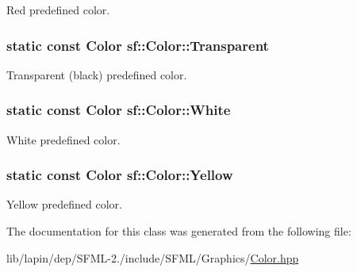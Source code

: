 Red predefined color. 

\hypertarget{classsf_1_1_color_a422c310394afa396d3a2798aad982145}{
\subsubsection[{Transparent}]{\setlength{\rightskip}{0pt plus 5cm}static {\bf const} {\bf Color} sf\-::\-Color\-::\-Transparent\hspace{0.3cm}{\ttfamily [static]}}}\label{classsf_1_1_color_a422c310394afa396d3a2798aad982145}


Transparent (black) predefined color. 

\hypertarget{classsf_1_1_color_abd9695b00da63b890ea40f74629237c0}{
\subsubsection[{White}]{\setlength{\rightskip}{0pt plus 5cm}static {\bf const} {\bf Color} sf\-::\-Color\-::\-White\hspace{0.3cm}{\ttfamily [static]}}}\label{classsf_1_1_color_abd9695b00da63b890ea40f74629237c0}


White predefined color. 

\hypertarget{classsf_1_1_color_ad2e5e0bad294384b8cf26a92d8d8d162}{
\subsubsection[{Yellow}]{\setlength{\rightskip}{0pt plus 5cm}static {\bf const} {\bf Color} sf\-::\-Color\-::\-Yellow\hspace{0.3cm}{\ttfamily [static]}}}\label{classsf_1_1_color_ad2e5e0bad294384b8cf26a92d8d8d162}


Yellow predefined color. 



The documentation for this class was generated from the following file\-:\begin{DoxyCompactItemize}
\item 
lib/lapin/dep/\-S\-F\-M\-L-\/2./include/\-S\-F\-M\-L/\-Graphics/\hyperlink{lib_2lapin_2dep_2_s_f_m_l-2_83_2include_2_s_f_m_l_2_graphics_2_color_8hpp}{Color.\-hpp}\end{DoxyCompactItemize}
